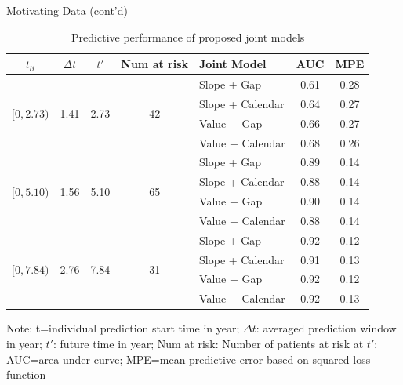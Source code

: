 \documentclass[fleqn]{beamer}
\begin{document}
\begin{frame}{Motivating Data (cont'd)}

    \begin{table}[H]
        \caption{\scriptsize Predictive performance of proposed joint models}
        \scriptsize
            \begin{threeparttable}
                \begin{tabular}{c|c|c|c|l|c|c}
                \toprule
            $t_{li}$ & $\Delta t$ & $t'$ & Num at risk & Joint Model & AUC & MPE \\ \hline
        \multirow{4}{*}{$[0,2.73)$}
        &\multirow{4}{*}{1.41} &\multirow{4}{*}{2.73} &\multirow{4}{*}{42} & Slope + Gap & 0.61 & 0.28 \\
        &&&& Slope + Calendar & 0.64 & 0.27 \\
        &&&& Value + Gap & 0.66 & 0.27 \\
        &&&& Value + Calendar & 0.68 & 0.26 \\ \cline{1-7}
        \multirow{4}{*}{$[0, 5.10)$} &\multirow{4}{*}{1.56} &\multirow{4}{*}{5.10} & \multirow{4}{*}{65} & Slope + Gap & 0.89 & 0.14 \\
        &&&& Slope + Calendar & 0.88 & 0.14 \\
        &&&& Value + Gap & 0.90 & 0.14 \\
        &&&& Value + Calendar & 0.88 &	0.14\\ \cline{1-7}
        \multirow{4}{*}{$[0, 7.84)$} &\multirow{4}{*}{2.76} &\multirow{4}{*}{7.84} & \multirow{4}{*}{31} & Slope + Gap & 0.92 &	0.12 \\
        &&&& Slope + Calendar & 0.91 & 0.13 \\
        &&&& Value + Gap & 0.92 &	0.12 \\
        &&&& Value + Calendar & 0.92 & 0.13\\ 
                \bottomrule
                \end{tabular}
        \begin{tablenotes}[para]
        \tiny
        Note: t=individual prediction start time in year; $\Delta t$: averaged prediction window in year; $t'$: future time in year; Num at risk: Number of patients at risk at $t'$; AUC=area under curve; MPE=mean predictive error based on squared loss function
        \end{tablenotes}
    \end{threeparttable}
    \end{table}
\end{frame}
\end{document}
